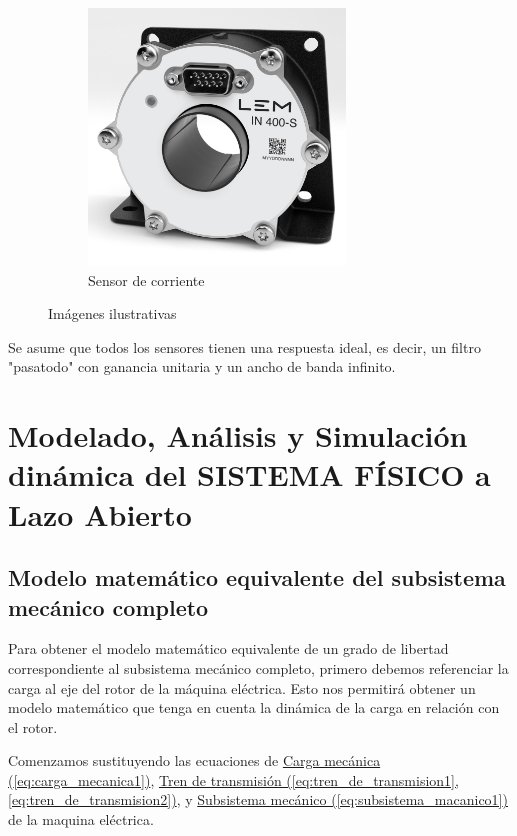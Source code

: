 \documentclass{article}
\begin{document}
\begin{figure}[ht]
\begin{subfigure}[b]{0.3\textwidth}
      \centering
      \includegraphics[width=0.75\textwidth]{Alan4.jpg}
      \caption{Sensor de corriente}
    \end{subfigure}
    \caption{Imágenes ilustrativas}
  \end{figure}


Se asume que todos los sensores tienen una respuesta ideal, es decir, un filtro "pasatodo" con ganancia 
unitaria y un ancho de banda infinito.


\section{Modelado, Análisis y Simulación dinámica del SISTEMA FÍSICO a Lazo Abierto}


\subsection{Modelo matemático equivalente del subsistema mecánico completo}

Para obtener el modelo matemático equivalente de un grado de libertad correspondiente al subsistema 
mecánico completo, primero debemos referenciar la carga al eje del rotor de la máquina eléctrica. Esto 
nos permitirá obtener un modelo matemático que tenga en cuenta la dinámica de la carga en relación con 
el rotor.

Comenzamos sustituyendo las ecuaciones de
\hyperref[eq:carga_mecanica1]{Carga mecánica (\ref*{eq:carga_mecanica1})}, 
\hyperref[eq:tren_de_transmision1, eq:tren_de_transmision2]{Tren de transmisión (\ref*{eq:tren_de_transmision1}, \ref*{eq:tren_de_transmision2})}, y
\hyperref[eq:subsistema_macanico1]{Subsistema mecánico (\ref*{eq:subsistema_macanico1})} de la maquina eléctrica.
\end{document}
